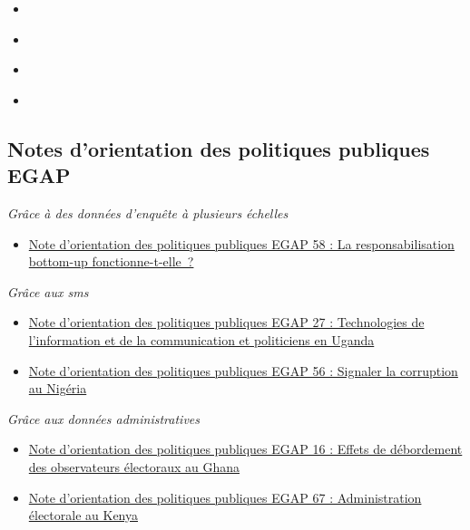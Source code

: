\documentclass[
  12pt,
]{book}
\providecommand{\tightlist}{%
  \setlength{\itemsep}{0pt}\setlength{\parskip}{0pt}}
\begin{document}
\begin{itemize}
\item
  \autocite{adcocoll:2001}
\item
  \autocite{scacco_can_2018}
\item
  \autocite{shadish2002experimental}
\item
  \autocite{vicente_is_2014}
\end{itemize}

\hypertarget{notes-dorientation-des-politiques-publiques-egap-2}{%
\subsection{Notes d'orientation des politiques publiques EGAP}\label{notes-dorientation-des-politiques-publiques-egap-2}}

\emph{Grâce à des données d'enquête à plusieurs échelles}

\begin{itemize}
\tightlist
\item
  \href{https://egap.org/resource/does-bottom-up-accountability-work-evidence-from-uganda/}{Note d'orientation des politiques publiques EGAP 58 : La responsabilisation bottom-up fonctionne-t-elle~?}
\end{itemize}

\emph{Grâce aux sms}

\begin{itemize}
\item
  \href{https://egap.org/resource/brief-27-ict-and-politicians-in-uganda/}{Note d'orientation des politiques publiques EGAP 27 : Technologies de l'information et de la communication et politiciens en Uganda}
\item
  \href{https://egap.org/resource/reporting-corruption-in-nigeria-testing-the-effects-of-norms-nudges/}{Note d'orientation des politiques publiques EGAP 56 : Signaler la corruption au Nigéria}
\end{itemize}

\emph{Grâce aux données administratives}

\begin{itemize}
\item
  \href{https://egap.org/resource/brief-16-spillover-effects-of-observers-in-ghana/}{Note d'orientation des politiques publiques EGAP 16 : Effets de débordement des observateurs électoraux au Ghana}
\item
  \href{https://egap.org/resource/electoral-administration-in-kenya/}{Note d'orientation des politiques publiques EGAP 67 : Administration électorale au Kenya}
\end{itemize}
\end{document}
